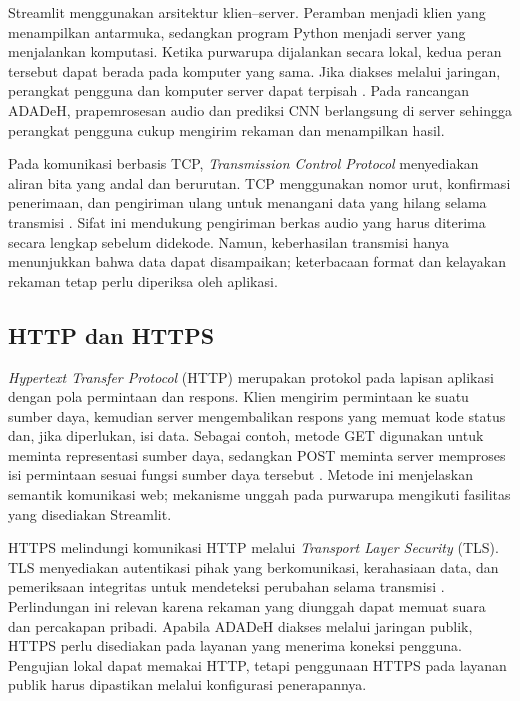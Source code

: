 Streamlit menggunakan arsitektur klien--server. Peramban menjadi klien yang menampilkan antarmuka, sedangkan program Python menjadi server yang menjalankan komputasi. Ketika purwarupa dijalankan secara lokal, kedua peran tersebut dapat berada pada komputer yang sama. Jika diakses melalui jaringan, perangkat pengguna dan komputer server dapat terpisah \autocite{streamlit2026docs}. Pada rancangan ADADeH, prapemrosesan audio dan prediksi CNN berlangsung di server sehingga perangkat pengguna cukup mengirim rekaman dan menampilkan hasil.

Pada komunikasi berbasis TCP, \textit{Transmission Control Protocol} menyediakan aliran bita yang andal dan berurutan. TCP menggunakan nomor urut, konfirmasi penerimaan, dan pengiriman ulang untuk menangani data yang hilang selama transmisi \autocite{eddy2022tcp}. Sifat ini mendukung pengiriman berkas audio yang harus diterima secara lengkap sebelum didekode. Namun, keberhasilan transmisi hanya menunjukkan bahwa data dapat disampaikan; keterbacaan format dan kelayakan rekaman tetap perlu diperiksa oleh aplikasi.

\subsection{HTTP dan HTTPS}
\label{http_https}

\textit{Hypertext Transfer Protocol} (HTTP) merupakan protokol pada lapisan aplikasi dengan pola permintaan dan respons. Klien mengirim permintaan ke suatu sumber daya, kemudian server mengembalikan respons yang memuat kode status dan, jika diperlukan, isi data. Sebagai contoh, metode GET digunakan untuk meminta representasi sumber daya, sedangkan POST meminta server memproses isi permintaan sesuai fungsi sumber daya tersebut \autocite{fielding2022http}. Metode ini menjelaskan semantik komunikasi web; mekanisme unggah pada purwarupa mengikuti fasilitas yang disediakan Streamlit.

HTTPS melindungi komunikasi HTTP melalui \textit{Transport Layer Security} (TLS). TLS menyediakan autentikasi pihak yang berkomunikasi, kerahasiaan data, dan pemeriksaan integritas untuk mendeteksi perubahan selama transmisi \autocite{rescorla2018tls}. Perlindungan ini relevan karena rekaman yang diunggah dapat memuat suara dan percakapan pribadi. Apabila ADADeH diakses melalui jaringan publik, HTTPS perlu disediakan pada layanan yang menerima koneksi pengguna. Pengujian lokal dapat memakai HTTP, tetapi penggunaan HTTPS pada layanan publik harus dipastikan melalui konfigurasi penerapannya.

